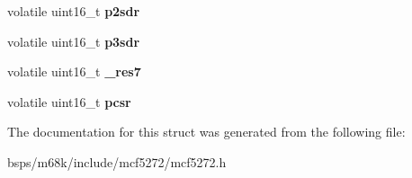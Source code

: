 \begin{DoxyCompactItemize}
volatile uint16\+\_\+t {\bfseries p2sdr}
\item 
\mbox{\label{structplic__regs__t_a13ea3d1a58ab09cc280d099b8a5108eb}} 
volatile uint16\+\_\+t {\bfseries p3sdr}
\item 
\mbox{\label{structplic__regs__t_a46822f255ea9b8786d4071126b6d7d40}} 
volatile uint16\+\_\+t {\bfseries \+\_\+res7}
\item 
\mbox{\label{structplic__regs__t_afdf77fc7500a6e9e99f7f344a0014a55}} 
volatile uint16\+\_\+t {\bfseries pcsr}
\end{DoxyCompactItemize}


The documentation for this struct was generated from the following file\+:\begin{DoxyCompactItemize}
\item 
bsps/m68k/include/mcf5272/mcf5272.\+h\end{DoxyCompactItemize}
